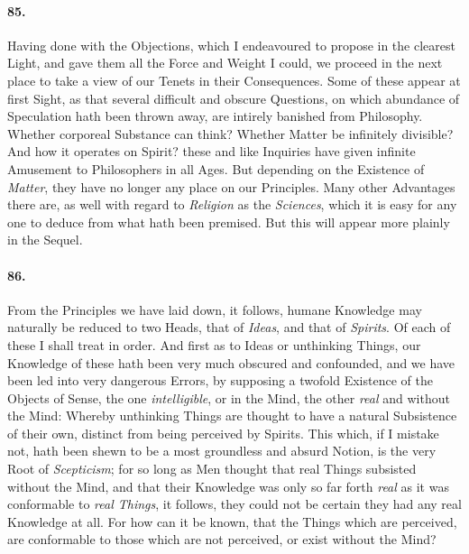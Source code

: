 \documentclass[]{article}
\newenvironment{sectionbody}{}{}
\begin{document}
\begin{sectionbody}
\paragraph{85.} Having done with the Objections, which I endeavoured to propose
in the clearest Light, and gave them all the Force and Weight I
could, we proceed in the next place to take a view of our Tenets
in their Consequences.  Some of these appear at first Sight, as
that several difficult and obscure Questions, on which abundance
of Speculation hath been thrown away, are intirely banished from
Philosophy.  Whether corporeal Substance can think?  Whether
Matter be infinitely divisible?  And how it operates on Spirit?
these and like Inquiries have given infinite Amusement to
Philosophers in all Ages.  But depending on the Existence of
\emph{Matter}, they have no longer any place on our Principles.
Many other Advantages there are, as well with regard to
\emph{Religion} as the \emph{Sciences}, which it is easy for
any one to deduce from what hath been premised.  But this will
appear more plainly in the Sequel.



\paragraph{86.} From the Principles we have laid down, it follows, humane
Knowledge may naturally be reduced to two Heads, that of
\emph{Ideas}, and that of \emph{Spirits}.  Of each of these I
shall treat in order.  And first as to Ideas or unthinking
Things, our Knowledge of these hath been very much obscured and
confounded, and we have been led into very dangerous Errors, by
supposing a twofold Existence of the Objects of Sense, the one
\emph{intelligible}, or in the Mind, the other \emph{real}
and without the Mind: Whereby unthinking Things are thought to
have a natural Subsistence of their own, distinct from being
perceived by Spirits.  This which, if I mistake not, hath been
shewn to be a most groundless and absurd Notion, is the very Root
of \emph{Scepticism}; for so long as Men thought that real
Things subsisted without the Mind, and that their Knowledge was
only so far forth \emph{real} as it was conformable to \emph{real
Things}, it follows, they could not be certain they had any
real Knowledge at all.  For how can it be known, that the Things
which are perceived, are conformable to those which are not
perceived, or exist without the Mind?




\end{sectionbody}
\end{document}
